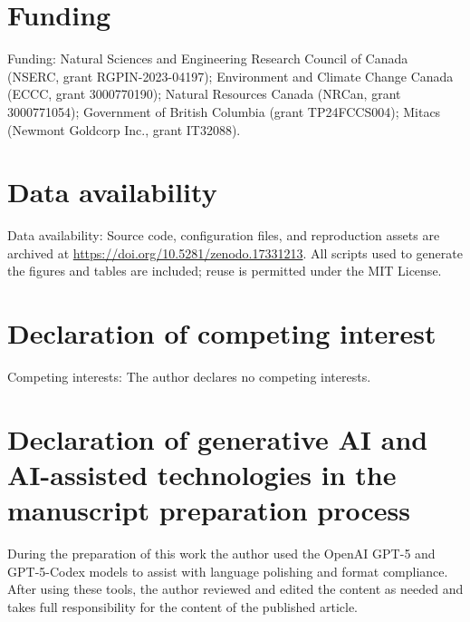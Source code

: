\documentclass[review]{elsarticle}
\begin{document}
\section*{Funding}
Funding: Natural Sciences and Engineering Research Council of Canada (NSERC, grant RGPIN-2023-04197); Environment and Climate Change Canada (ECCC, grant 3000770190); Natural Resources Canada (NRCan, grant 3000771054); Government of British Columbia (grant TP24FCCS004); Mitacs (Newmont Goldcorp Inc., grant IT32088).

\section*{Data availability}
Data availability: Source code, configuration files, and reproduction assets are archived at \href{https://doi.org/10.5281/zenodo.17331213}{https://doi.org/10.5281/zenodo.17331213}. All scripts used to generate the figures and tables are included; reuse is permitted under the MIT License.

\section*{Declaration of competing interest}
Competing interests: The author declares no competing interests.

\section*{Declaration of generative AI and AI-assisted technologies in the manuscript preparation process}
During the preparation of this work the author used the OpenAI GPT-5 and GPT-5-Codex models to assist with language polishing and format compliance. After using these tools, the author reviewed and edited the content as needed and takes full responsibility for the content of the published article.



\end{document}
